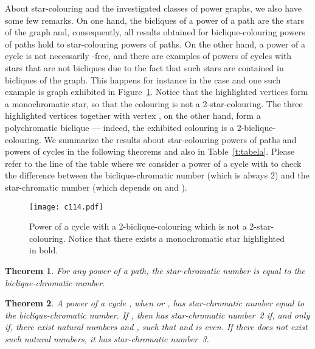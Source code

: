 \documentclass{article}
\newtheorem{theorem}{Theorem}
\begin{document}
About star-colouring and the investigated classes of power graphs,
we also have some few remarks. On one hand, the bicliques of a power of a path  are
the stars of the graph and, consequently, all results obtained for
biclique-colouring powers of paths hold to star-colouring powers of paths.
On the other hand, a power of a cycle  is not necessarily -free, and
there are examples of powers of cycles with  stars that are not bicliques
due to the fact that such  stars are contained in  bicliques of the
graph. This happens for instance in the case  and one such
example is graph  exhibited in Figure~\ref{fig:c114}. Notice that the highlighted
vertices form a monochromatic  star, so that the colouring is not a
2-star-colouring. The three highlighted vertices together with vertex , on
the other hand, form a polychromatic  biclique --- indeed, the
exhibited colouring is a 2-biclique-colouring. 
We summarize the results about star-colouring powers of paths and powers of
cycles in the following theorems and also in Table~\ref{t:tabela}. Please refer
to the line of the table where we consider a power of a cycle with  to check the difference between the biclique-chromatic number
(which is always 2) and the star-chromatic number (which depends on  and
).

\begin{figure}[t]
\centering
	\texttt{[image: c114.pdf]}
	\caption{Power of a cycle  with a
	2-biclique-colouring which is not a 2-star-colouring. 
	Notice that there exists a monochromatic  star
	highlighted in bold.}
	\label{fig:c114}
\end{figure}

\begin{theorem}
For any power of a path, the star-chromatic number is equal to the
biclique-chromatic number.
\end{theorem}


\begin{theorem}
A power of a cycle , when  or , has
star-chromatic number equal to the biclique-chromatic number.
If , then  has star-chromatic number~2 if, and
only if, there exist natural numbers  and , such that  and
 is even. If there does not exist such natural numbers, it has
star-chromatic number~3.
\end{theorem}
\end{document}
